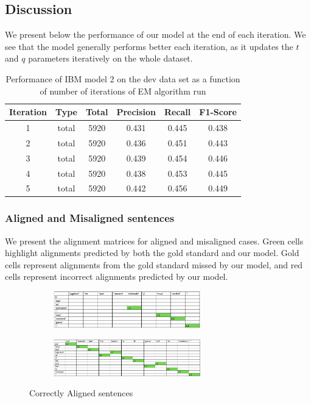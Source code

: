 \documentclass{article}
\begin{document}
	\subsection{Discussion}
		We present below the performance of our model at the end of each iteration. We see that the model generally performs better each iteration, as it updates the $t$ and $q$ parameters iteratively on the whole dataset.
		\begin{table}[htbp]
			\center
			\begin{tabular}{|c|c|c|c|c|c|}
				\hline
				Iteration&Type&Total&Precision&Recall&F1-Score\\
				\hline
				1&total&        5920&     0.431&        0.445&        0.438\\
				\hline
				2&total&        5920&     0.436&        0.451&        0.443\\
				\hline
				3&total&        5920&     0.439&        0.454&        0.446\\
				\hline
				4&total&        5920&     0.438&        0.453&        0.445\\
				\hline
				5&total&        5920&     0.442&        0.456&        0.449\\
				\hline
			\end{tabular}
			\caption{Performance of IBM model 2 on the dev data set as a function of number of iterations of EM algorithm run}
		\end{table}
	\subsubsection{Aligned and Misaligned sentences}
		We present the alignment matrices for aligned and misaligned cases. Green cells highlight alignments predicted by both the gold standard and our model. Gold cells represent alignments from the gold standard missed by our model, and red cells represent incorrect alignments predicted by our model.
		\begin{figure}[htbp]
			\center
			\begin{subfigure}{\textwidth}
				\includegraphics[width=0.7\textwidth]{alignment.png}
			\end{subfigure}
			\begin{subfigure}{\textwidth}
				\includegraphics[width=0.7\textwidth]{alignment_1.png}
			\end{subfigure}
			\caption{Correctly Aligned sentences}
		\end{figure}
\end{document}
